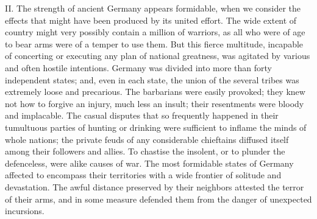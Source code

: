 
II. The strength of ancient Germany appears formidable, when we
consider the effects that might have been produced by its united
effort. The wide extent of country might very possibly contain a
million of warriors, as all who were of age to bear arms were of
a temper to use them. But this fierce multitude, incapable of
concerting or executing any plan of national greatness, was
agitated by various and often hostile intentions. Germany was
divided into more than forty independent states; and, even in
each state, the union of the several tribes was extremely loose
and precarious. The barbarians were easily provoked; they knew
not how to forgive an injury, much less an insult; their
resentments were bloody and implacable. The casual disputes that
so frequently happened in their tumultuous parties of hunting or
drinking were sufficient to inflame the minds of whole nations;
the private feuds of any considerable chieftains diffused itself
among their followers and allies. To chastise the insolent, or to
plunder the defenceless, were alike causes of war. The most
formidable states of Germany affected to encompass their
territories with a wide frontier of solitude and devastation. The
awful distance preserved by their neighbors attested the terror
of their arms, and in some measure defended them from the danger
of unexpected incursions.\footnotemark[77]


